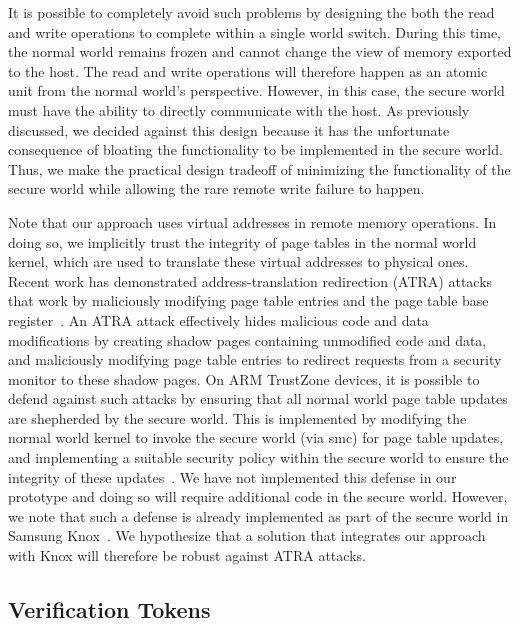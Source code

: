 \documentclass[pageno]{sig-alternate-05-2015}
\newcommand{\addtext}[2]{#2}
\begin{document}
It is possible to completely avoid such problems by designing the both the read
and write operations to complete within a single world switch. During this
time, the normal world remains frozen and cannot change the view of memory
exported to the host. The read and write operations will therefore happen as an
atomic unit from the normal world's perspective. However, in this case, the
secure world must have the ability to directly communicate with the host. As
previously discussed, we decided against this design because it has the
unfortunate consequence of bloating the functionality to be implemented in the
secure world.  Thus, we make the practical design tradeoff of minimizing the
functionality of the secure world while allowing the rare remote write failure
to happen.

\addtext{Task 15}{Note that our approach uses virtual addresses in remote
memory operations. In doing so, we implicitly trust the integrity of page
tables in the normal world kernel, which are used to translate these virtual
addresses to physical ones. Recent work has demonstrated address-translation
redirection (ATRA) attacks that work by maliciously modifying page table
entries and the page table base register~\cite{atra:ccs14}. An ATRA attack
effectively hides malicious code and data modifications by creating shadow
pages containing unmodified code and data, and maliciously modifying page table
entries to redirect requests from a security monitor to these shadow pages.  On
ARM TrustZone devices, it is possible to defend against such attacks by
ensuring that all normal world page table updates are shepherded by the secure
world. This is implemented by modifying the normal world kernel to invoke the
secure world (via \textsf{smc}) for page table updates, and implementing a
suitable security policy within the secure world to ensure the integrity of
these updates~\cite{knox:ccs14,sprobes:most14}. We have not implemented this
defense in our prototype and doing so will require additional code in the
secure world. However, we note that such a defense is already implemented as
part of the secure world in Samsung Knox~\cite{knox:ccs14}. We hypothesize that
a solution that integrates our approach with Knox will therefore be robust
against ATRA attacks.}

\subsection{Verification Tokens}
\label{section:mechanism:tokens}
\end{document}
